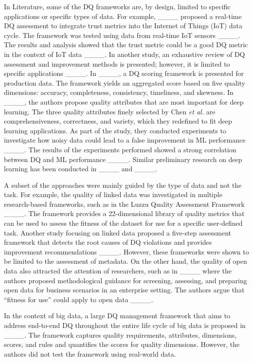 In Literature, some of the DQ frameworks are, by design, limited to specific applications or specific types of data. For example, ____ proposed a real-time DQ assessment to integrate trust metrics into the Internet of Things (IoT) data cycle. The framework was tested using data from real-time IoT sensors ____. The results and analysis showed that the trust metric could be a good DQ metric in the context of IoT data ____. In another study, an exhaustive review of DQ assessment and improvement methods is presented; however, it is limited to specific applications ____. In ____, a DQ scoring framework is presented for production data. The framework yields an aggregated score based on five quality dimensions: accuracy, completeness, consistency, timeliness, and skewness. In ____, the authors propose quality attributes that are most important for deep learning. The three quality attributes finely selected by Chen \emph{et al.} are comprehensiveness, correctness, and variety, which they redefined to fit deep learning applications. As part of the study, they conducted experiments to investigate how noisy data could lead to a false improvement in ML performance ____. The results of the experiments performed showed a strong correlation between DQ and ML performance ____. Similar preliminary research on deep learning has been conducted in ____ and ____. 

A subset of the approaches were mainly guided by the type of data and not the task. For example, the quality of linked data was investigated in multiple research-based frameworks, such as in the Luzzu Quality Assessment Framework ____. The framework provides a 22-dimensional library of quality metrics that can be used to assess the fitness of the dataset for use for a specific user-defined task. Another study focusing on linked data proposed a five-step assessment framework that detects the root causes of DQ violations and provides improvement recommendations ____. However, these frameworks were shown to be limited to the assessment of metadata. On the other hand, the quality of open data also attracted the attention of researchers, such as in ____ where the authors proposed methodological guidance for screening, assessing, and preparing open data for business scenarios in an enterprise setting. The authors argue that “fitness for use” could apply to open data ____.

In the context of big data, a large DQ management framework that aims to address end-to-end DQ throughout the entire life cycle of big data is proposed in ____. The framework captures quality requirements, attributes, dimensions, scores, and rules and quantifies the scores for quality dimensions. However, the authors did not test the framework using real-world data. 

